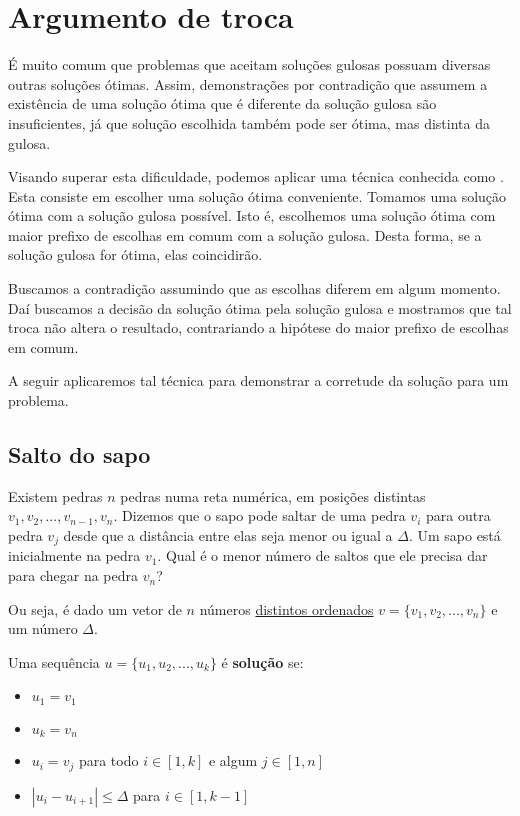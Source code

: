 \chapter{Argumento de troca}
\label{salto}

É muito comum que problemas que aceitam soluções gulosas possuam diversas outras soluções ótimas. Assim, demonstrações por contradição que assumem a existência de uma solução ótima que é diferente da solução gulosa são insuficientes, já que solução escolhida também pode ser ótima, mas distinta da gulosa.

Visando superar esta dificuldade, podemos aplicar uma técnica conhecida como . Esta consiste em escolher uma solução ótima conveniente. Tomamos uma solução ótima  com a solução gulosa possível. Isto é, escolhemos uma solução ótima com maior prefixo de escolhas em comum com a solução gulosa. Desta forma, se a solução gulosa for ótima, elas coincidirão.

Buscamos a contradição assumindo que as escolhas diferem em algum momento. Daí buscamos  a decisão da solução ótima pela solução gulosa e mostramos que tal troca não altera o resultado, contrariando a hipótese do maior prefixo de escolhas em comum.

A seguir aplicaremos tal técnica para demonstrar a corretude da solução para um problema.

\section{Salto do sapo}

Existem pedras $n$ pedras numa reta numérica, em posições distintas $v_1, v_2, ..., v_{n - 1}, v_n$. Dizemos que o sapo pode saltar de uma pedra $v_i$ para outra pedra $v_j$ desde que a distância entre elas seja menor ou igual a $\Delta$. Um sapo está inicialmente na pedra $v_1$. Qual é o menor número de saltos que ele precisa dar para chegar na pedra $v_n$? 

Ou seja, é dado um vetor de $n$ números \underline{distintos ordenados} $v = \{v_1, v_2, ..., v_n\}$ e um número $\Delta$.

Uma sequência $u = \{u_1, u_2, ..., u_k\}$ é \textbf{solução} se:
\begin{itemize}
    \item $u_1 = v_1$
    \item $u_k = v_n$
    \item $u_i = v_j$ para todo $i \in [1, k]$ e algum $j \in [1, n]$
    \item $|u_i - u_{i + 1}| \leq \Delta$ para $i \in [1, k - 1]$
\end{itemize}

